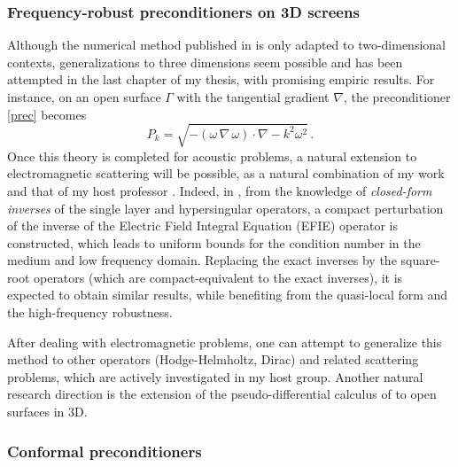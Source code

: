 \documentclass[]{report}
\begin{document}
\subsubsection*{Frequency-robust preconditioners on 3D screens}

Although the numerical method published in \cite{alouges2019new} is only adapted to
two-dimensional contexts, generalizations to three dimensions seem possible and has been
attempted in the last chapter of my thesis, with promising empiric results. For instance,
on an open surface $\Gamma$ with the tangential gradient $\nabla$, the preconditioner
\eqref{prec} becomes
\[P_k = \sqrt{-(\omega\,\nabla \,\omega) \cdot \nabla - k^2 \omega^2}\,.\] Once this
theory is completed for acoustic problems, a natural extension to electromagnetic
scattering will be possible, as a natural combination of my work and that of my host
professor \cite{hiptmair2019preconditioning}. Indeed, in
\cite{hiptmair2019preconditioning}, from the knowledge of \textit{closed-form inverses} of
the single layer and hypersingular operators, a compact perturbation of the inverse of the
Electric Field Integral Equation (EFIE) operator is constructed, which leads to uniform
bounds for the condition number in the medium and low frequency domain. Replacing the
exact inverses by the square-root operators (which are compact-equivalent to the exact
inverses), it is expected to obtain similar results, while benefiting from the quasi-local
form and the high-frequency robustness.

After dealing with electromagnetic problems, one can attempt to generalize this method to
other operators (Hodge-Helmholtz, Dirac) and related scattering problems, which are
actively investigated in my host group.  Another natural research direction is the extension of the
pseudo-differential calculus of \cite{averseng2019pseudo} to open surfaces in 3D.

\subsubsection*{Conformal preconditioners}
\end{document}
